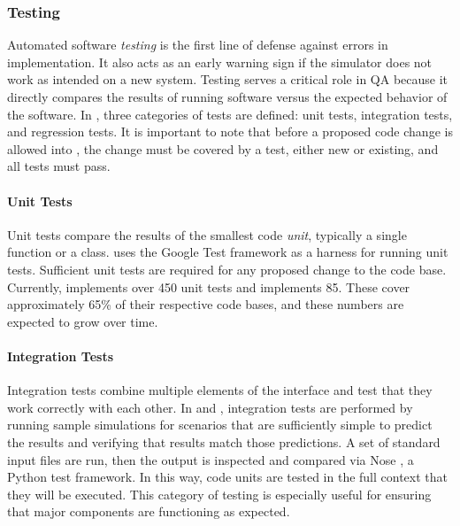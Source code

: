 \subsubsection{Testing}
\label{sec:qa-testing}

Automated software \emph{testing} is the first line of defense against
errors in implementation. It also acts as an early warning sign if the
simulator does not work as intended on a new system.
Testing serves a critical role in \gls{QA} because it directly compares the
results of running software versus the expected behavior of the software.
In \Cyclus, three categories of tests are defined: unit tests, integration
tests, and regression tests.  It is important to note that before a proposed
code change is allowed into \Cyclus,  the change must be covered by a test, either new or existing, and all tests must pass.

\paragraph{Unit Tests}

Unit tests compare the results of the smallest code \emph{unit}, typically a
single function or a class.  \Cyclus uses the Google Test framework
\cite{inc_googletest_2008} as a harness for running unit tests. Sufficient unit
tests are required for any proposed change to the \Cyclus code base. Currently,
\Cyclus implements over 450 unit tests and \Cycamore implements 85.  These
cover approximately 65\% of their respective code bases, and these numbers are
expected to grow over time.

\paragraph{Integration Tests}

Integration tests combine multiple elements of the
\Cyclus interface and test that they work correctly with each other. 
In \Cyclus and \Cycamore, integration tests are performed by running sample
simulations for scenarios that are sufficiently simple to predict the results
and verifying that results match those predictions. A set of standard input
files are run, then the output is inspected and compared via Nose
\cite{pellerin_nose_2007}, a Python test framework.  In this way, \Cyclus code
units are tested in the full context that they will be
executed. This category of testing is especially useful for ensuring that
major \Cyclus components are functioning as expected.

